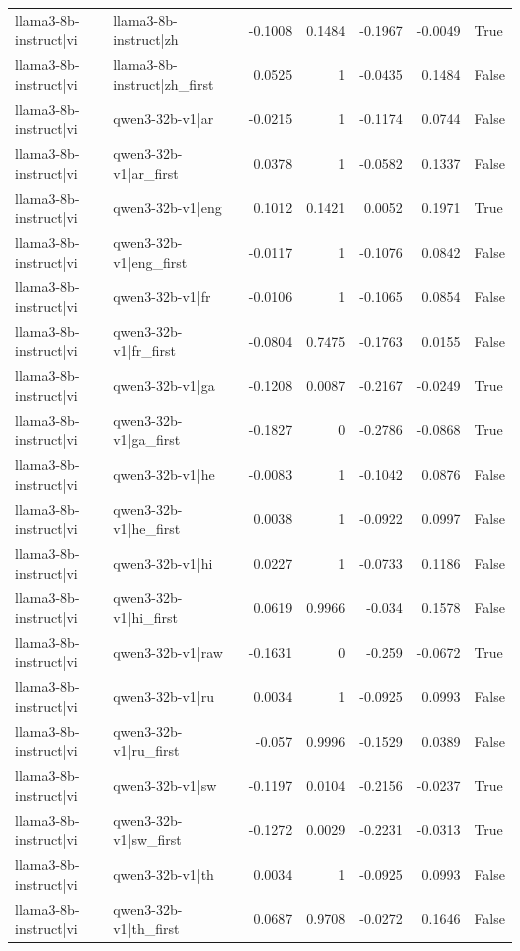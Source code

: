 \begin{table}
\begin{tabular}{l l r r r r l}
llama3-8b-instruct|vi & llama3-8b-instruct|zh & -0.1008 & 0.1484 & -0.1967 & -0.0049 & True \\
llama3-8b-instruct|vi & llama3-8b-instruct|zh_first & 0.0525 & 1 & -0.0435 & 0.1484 & False \\
llama3-8b-instruct|vi & qwen3-32b-v1|ar & -0.0215 & 1 & -0.1174 & 0.0744 & False \\
llama3-8b-instruct|vi & qwen3-32b-v1|ar_first & 0.0378 & 1 & -0.0582 & 0.1337 & False \\
llama3-8b-instruct|vi & qwen3-32b-v1|eng & 0.1012 & 0.1421 & 0.0052 & 0.1971 & True \\
llama3-8b-instruct|vi & qwen3-32b-v1|eng_first & -0.0117 & 1 & -0.1076 & 0.0842 & False \\
llama3-8b-instruct|vi & qwen3-32b-v1|fr & -0.0106 & 1 & -0.1065 & 0.0854 & False \\
llama3-8b-instruct|vi & qwen3-32b-v1|fr_first & -0.0804 & 0.7475 & -0.1763 & 0.0155 & False \\
llama3-8b-instruct|vi & qwen3-32b-v1|ga & -0.1208 & 0.0087 & -0.2167 & -0.0249 & True \\
llama3-8b-instruct|vi & qwen3-32b-v1|ga_first & -0.1827 & 0 & -0.2786 & -0.0868 & True \\
llama3-8b-instruct|vi & qwen3-32b-v1|he & -0.0083 & 1 & -0.1042 & 0.0876 & False \\
llama3-8b-instruct|vi & qwen3-32b-v1|he_first & 0.0038 & 1 & -0.0922 & 0.0997 & False \\
llama3-8b-instruct|vi & qwen3-32b-v1|hi & 0.0227 & 1 & -0.0733 & 0.1186 & False \\
llama3-8b-instruct|vi & qwen3-32b-v1|hi_first & 0.0619 & 0.9966 & -0.034 & 0.1578 & False \\
llama3-8b-instruct|vi & qwen3-32b-v1|raw & -0.1631 & 0 & -0.259 & -0.0672 & True \\
llama3-8b-instruct|vi & qwen3-32b-v1|ru & 0.0034 & 1 & -0.0925 & 0.0993 & False \\
llama3-8b-instruct|vi & qwen3-32b-v1|ru_first & -0.057 & 0.9996 & -0.1529 & 0.0389 & False \\
llama3-8b-instruct|vi & qwen3-32b-v1|sw & -0.1197 & 0.0104 & -0.2156 & -0.0237 & True \\
llama3-8b-instruct|vi & qwen3-32b-v1|sw_first & -0.1272 & 0.0029 & -0.2231 & -0.0313 & True \\
llama3-8b-instruct|vi & qwen3-32b-v1|th & 0.0034 & 1 & -0.0925 & 0.0993 & False \\
llama3-8b-instruct|vi & qwen3-32b-v1|th_first & 0.0687 & 0.9708 & -0.0272 & 0.1646 & False \\

\end{tabular}
\end{table}
